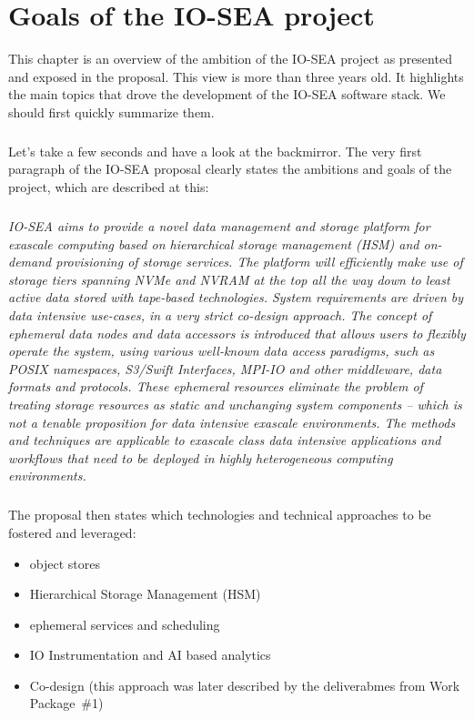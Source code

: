 \chapter{Goals of the IO-SEA project}\label{chap:goals}

This chapter is an overview of the ambition of the IO-SEA project as presented and exposed in the proposal.
This view is more than three years old. It highlights the main topics that drove the development of the IO-SEA
software stack. We should first quickly summarize them. 

\paragraph{}
Let's take a few seconds and have a look at the backmirror. The very first paragraph of the IO-SEA proposal 
clearly states the ambitions and goals of the project, which are described at this:

\paragraph{}
\textit{
IO-SEA aims to provide a novel data management and storage platform for exascale computing based on hierarchical
storage management (HSM) and on-demand provisioning of storage services. The platform will efficiently make use of
storage tiers spanning NVMe and NVRAM at the top all the way down to least active data stored with tape-based
technologies. System requirements are driven by data intensive use-cases, in a very strict co-design approach. The
concept of ephemeral data nodes and data accessors is introduced that allows users to flexibly operate the system,
using various well-known data access paradigms, such as POSIX namespaces, S3/Swift Interfaces, MPI-IO and other
middleware, data formats and protocols. These ephemeral resources eliminate the problem of treating storage
resources as static and unchanging system components – which is not a tenable proposition for data intensive
exascale environments. The methods and techniques are applicable to exascale class data intensive applications and
workflows that need to be deployed in highly heterogeneous computing environments.
}

\paragraph{}
The proposal then states which technologies and technical approaches to be fostered and leveraged:
\begin{itemize}
    \item object stores
    \item Hierarchical Storage Management (HSM)
    \item ephemeral services and scheduling
    \item IO Instrumentation and AI based analytics
    \item Co-design (this approach was later described by the deliverabmes from Work Package~\#1\cite{iosea-d1.1})
\end{itemize}

